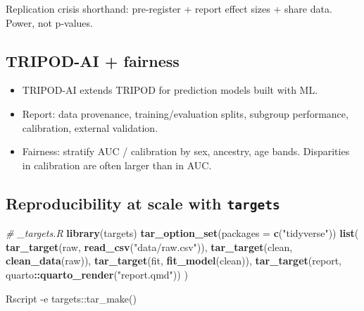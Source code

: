 \documentclass[
]{article}
\newenvironment{Shaded}{\begin{snugshade}}{\end{snugshade}}
\newcommand{\AttributeTok}[1]{\textcolor[rgb]{0.13,0.29,0.53}{#1}}
\newcommand{\CommentTok}[1]{\textcolor[rgb]{0.56,0.35,0.01}{\textit{#1}}}
\newcommand{\ExtensionTok}[1]{#1}
\newcommand{\FunctionTok}[1]{\textcolor[rgb]{0.13,0.29,0.53}{\textbf{#1}}}
\newcommand{\NormalTok}[1]{#1}
\newcommand{\SpecialCharTok}[1]{\textcolor[rgb]{0.81,0.36,0.00}{\textbf{#1}}}
\newcommand{\StringTok}[1]{\textcolor[rgb]{0.31,0.60,0.02}{#1}}
\providecommand{\tightlist}{%
  \setlength{\itemsep}{0pt}\setlength{\parskip}{0pt}}
\begin{document}
Replication crisis shorthand: pre-register + report effect sizes + share
data. Power, not p-values.

\subsection{TRIPOD-AI + fairness}\label{tripod-ai-fairness}

\begin{itemize}
\tightlist
\item
  TRIPOD-AI extends TRIPOD for prediction models built with ML.
\item
  Report: data provenance, training/evaluation splits, subgroup
  performance, calibration, external validation.
\item
  Fairness: stratify AUC / calibration by sex, ancestry, age bands.
  Disparities in calibration are often larger than in AUC.
\end{itemize}

\subsection{\texorpdfstring{Reproducibility at scale with
\texttt{targets}}{Reproducibility at scale with targets}}\label{reproducibility-at-scale-with-targets}

\begin{Shaded}
\begin{Highlighting}[]
\CommentTok{\# \_targets.R}
\FunctionTok{library}\NormalTok{(targets)}
\FunctionTok{tar\_option\_set}\NormalTok{(}\AttributeTok{packages =} \FunctionTok{c}\NormalTok{(}\StringTok{"tidyverse"}\NormalTok{))}
\FunctionTok{list}\NormalTok{(}
  \FunctionTok{tar\_target}\NormalTok{(raw, }\FunctionTok{read\_csv}\NormalTok{(}\StringTok{"data/raw.csv"}\NormalTok{)),}
  \FunctionTok{tar\_target}\NormalTok{(clean, }\FunctionTok{clean\_data}\NormalTok{(raw)),}
  \FunctionTok{tar\_target}\NormalTok{(fit, }\FunctionTok{fit\_model}\NormalTok{(clean)),}
  \FunctionTok{tar\_target}\NormalTok{(report, quarto}\SpecialCharTok{::}\FunctionTok{quarto\_render}\NormalTok{(}\StringTok{"report.qmd"}\NormalTok{))}
\NormalTok{)}
\end{Highlighting}
\end{Shaded}

\begin{Shaded}
\begin{Highlighting}[]
\ExtensionTok{Rscript} \AttributeTok{{-}e} \StringTok{\textquotesingle{}targets::tar\_make()\textquotesingle{}}
\end{Highlighting}
\end{Shaded}
\end{document}
